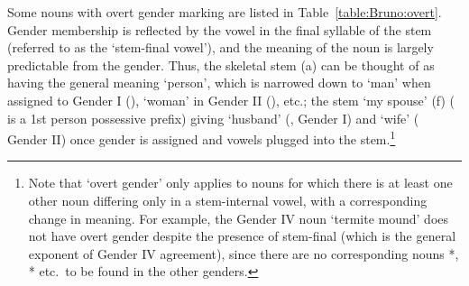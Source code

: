 \documentclass[output=collectionpaper]{langsci/langscibook}
\begin{document}
Some nouns with overt gender marking are listed in Table~\ref{table:Bruno:overt}. Gender membership is reflected by the vowel in the final syllable of the stem (referred to as the `stem-final vowel'), and the meaning of the noun is largely predictable from the gender. Thus, the skeletal stem  (a) can be thought of as having the general meaning `person', which is narrowed down to `man' when assigned to Gender I (), `woman' in Gender II (), etc.; the stem  `my spouse' (f) ( is a 1st person possessive prefix) giving `husband' (, Gender I) and `wife' ( Gender II) once gender is assigned and vowels plugged into the stem.\footnote{Note that `overt gender' only applies to nouns for which there is at least one other noun differing only in a stem-internal vowel, with a corresponding change in meaning. For example, the Gender IV noun  `termite mound' does not have overt gender despite the presence of stem-final  (which is the general exponent of Gender IV agreement), since there are no corresponding nouns *, * etc.\ to be found in the other genders.}
\end{document}
